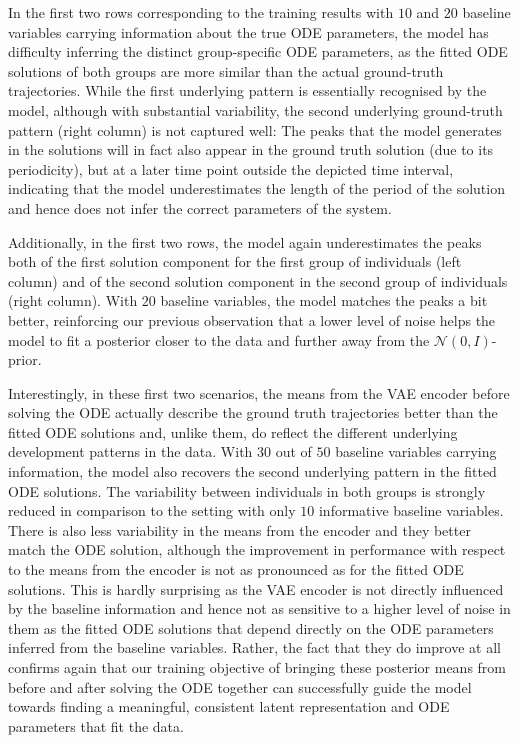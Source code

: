 In the first two rows corresponding to the training results with $10$ and $20$ baseline variables carrying information about the true ODE parameters, the model has difficulty inferring the distinct group-specific ODE parameters, as the fitted ODE solutions of both groups are more similar than the actual ground-truth trajectories. While the first underlying pattern is essentially recognised by the model, although with substantial variability, the second underlying ground-truth pattern (right column) is not captured well: The peaks that the model generates in the solutions will in fact also appear in the ground truth solution (due to its periodicity), but at a later time point outside the depicted time interval, indicating that the model underestimates the length of the period of the solution and hence does not infer the correct parameters of the system. 

Additionally, in the first two rows, the model again underestimates the peaks both of the first solution component for the first group of individuals (left column) and of the second solution component in the second group of individuals (right column). With $20$ baseline variables, the model matches the peaks a bit better, reinforcing our previous observation that a lower level of noise helps the model to fit a posterior closer to the data and further away from the $\mathcal{N}(0,I)$-prior.  

Interestingly, in these first two scenarios, the means from the VAE encoder before solving the ODE actually describe the ground truth trajectories better than the fitted ODE solutions and, unlike them, do reflect the different underlying development patterns in the data. 
With $30$ out of $50$ baseline variables carrying information, the model also recovers the second underlying pattern in the fitted ODE solutions. The variability between individuals in both groups is strongly reduced in comparison to the setting with only $10$ informative baseline variables. There is also less variability in the means from the encoder and they better match the ODE solution, although the improvement in performance with respect to the means from the encoder is not as pronounced as for the fitted ODE solutions. 
This is hardly surprising as the VAE encoder is not directly influenced by the baseline information and hence not as sensitive to a higher level of noise in them as the fitted ODE solutions that depend directly on the ODE parameters inferred from the baseline variables. Rather, the fact that they do improve at all confirms again that our training objective of bringing these posterior means from before and after solving the ODE together can successfully guide the model towards finding a meaningful, consistent latent representation and ODE parameters that fit the data.

